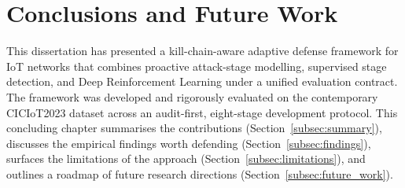\clearpage
\section{Conclusions and Future Work}\label{sec:conclusion}

This dissertation has presented a kill-chain-aware adaptive defense framework for IoT networks that combines proactive attack-stage modelling, supervised stage detection, and Deep Reinforcement Learning under a unified evaluation contract. The framework was developed and rigorously evaluated on the contemporary CICIoT2023 dataset across an audit-first, eight-stage development protocol. This concluding chapter summarises the contributions (Section~\ref{subsec:summary}), discusses the empirical findings worth defending (Section~\ref{subsec:findings}), surfaces the limitations of the approach (Section~\ref{subsec:limitations}), and outlines a roadmap of future research directions (Section~\ref{subsec:future_work}).

